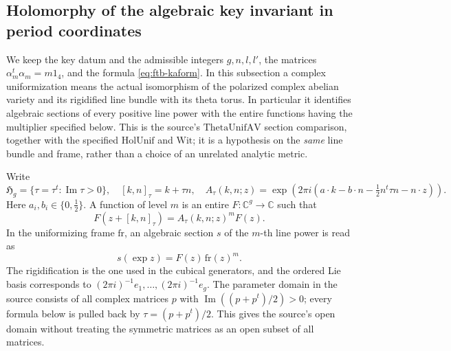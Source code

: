 \subsection{Holomorphy of the algebraic key invariant in period coordinates}
\label{sec:ftb-key-period-holomorphy}

We keep the key datum and the admissible integers \(g,n,l,l'\),
the matrices \(\alpha_m^t\alpha_m=m1_4\), and the formula
\eqref{eq:ftb-kaform}.  In this subsection a complex uniformization
means the actual isomorphism of the polarized complex abelian variety
and its rigidified line bundle with its theta torus.  In particular it
identifies algebraic sections of every positive line power with the
entire functions having the multiplier specified below.  This is the
source's \(\mathrm{ThetaUnifAV}\) section comparison, together with
the specified \(\mathrm{HolUnif}\) and \(\mathrm{Wit}\); it is a
hypothesis on the \emph{same} line bundle and frame, rather than a
choice of an unrelated analytic metric.

Write
\[
 \mathfrak H_g=\{\tau=\tau^t:\operatorname{Im}\tau>0\},\quad
 [k,n]_\tau=k+\tau n,\quad
 A_\tau(k,n;z)=
 \exp\!\left(2\pi i\left(a\cdot k-b\cdot n
                      -\tfrac12 n^t\tau n-n\cdot z\right)\right).
 \tag{H1}\label{eq:ftb-level-aut}
\]
Here \(a_i,b_i\in\{0,\tfrac12\}\).
A function of level \(m\) is an entire \(F:\mathbb C^g\to\mathbb C\)
such that
\[
 F(z+[k,n]_\tau)=A_\tau(k,n;z)^mF(z).
 \tag{H2}\label{eq:ftb-level-fn}
\]
In the uniformizing frame \(\mathrm{fr}\), an algebraic section \(s\)
of the \(m\)-th line power is read as
\[
                       s(\exp z)=F(z)\,\mathrm{fr}(z)^m.
 \tag{H3}\label{eq:ftb-fnpw}
\]
The rigidification is the one used in the cubical generators, and
the ordered Lie basis corresponds to
\((2\pi i)^{-1}e_1,\ldots,(2\pi i)^{-1}e_g\).
The parameter domain in the source consists of all complex matrices
\(p\) with \(\operatorname{Im}((p+p^t)/2)>0\);
every formula below is pulled back by \(\tau=(p+p^t)/2\).
This gives the source's open domain without treating the symmetric
matrices as an open subset of all matrices.

